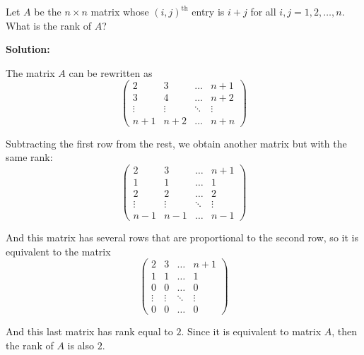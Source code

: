 \documentclass[../../main.tex]{subfiles}
\begin{document}
  \begin{shaded}
    Let $A$ be the $n \times n$ matrix whose $(i, j)^\text{th}$ entry is $i + j$ for all $i, j = 1, 2, \dots, n$. What is the rank of $A$?
  \end{shaded}

  \textbf{Solution:}

  The matrix $A$ can be rewritten as
  $$
  \begin{pmatrix}
    2 & 3 & \dots & n + 1 \\
    3 & 4 & \dots & n + 2 \\
    \vdots & \vdots & \ddots & \vdots \\
    n + 1 & n + 2 & \dots & n + n
  \end{pmatrix}
  $$

  Subtracting the first row from the rest, we obtain another matrix but with the same rank:
  $$
  \begin{pmatrix}
    2 & 3 & \dots & n + 1 \\
    1 & 1 & \dots & 1 \\
    2 & 2 & \dots & 2 \\
    \vdots & \vdots & \ddots & \vdots \\
    n - 1 & n - 1 & \dots & n - 1
  \end{pmatrix}
  $$

  And this matrix has several rows that are proportional to the second row, so it is equivalent to the matrix
  $$
  \begin{pmatrix}
    2 & 3 & \dots & n + 1 \\
    1 & 1 & \dots & 1 \\
    0 & 0 & \dots & 0 \\
    \vdots & \vdots & \ddots & \vdots \\
    0 & 0 & \dots & 0
  \end{pmatrix}
  $$

  And this last matrix has rank equal to $2$. Since it is equivalent to matrix $A$, then the rank of $A$ is also $2$.
\end{document}
